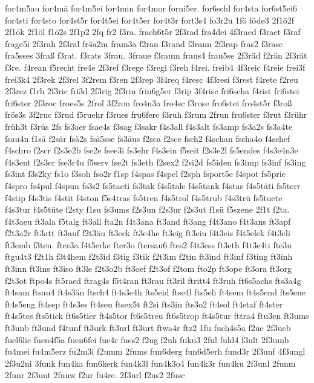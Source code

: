 {for4m5au
for4mä
for4m5ei
for4min
for4mor
forni5er.
for6schl
for4sta
for6st5ei6
for4sti
for4sto
for4st5r
for4t5ei
for4t5er
for4t3r
fort3s4
fo3r2u
1fö
föde3
2f1ö2f
2f1ök
2f1öl
f1ö2s
2f1p2
2fq
fr2
f3ra.
frach6t5r
2f3rad
fra4dei
4f3raed
f3raet
f3raf
frage5i
2f3rah
2f3ral
fr4a2m
fram3a
f2ran
f3rand
f3rann
2f3rap
fras2
f3rase
fra5sses
3fraß
f3rat.
f3rats
3frau.
3fraue
f3raum
fraus4
frau5se
2f3räd
f2rän
2f3rät
f3re.
f4rean
f5recht
fre4e
2f3ref
f3rege
f3regi
f3reh
f4rei.
freib4
4f3reic
f4reie
frei3f
frei3k4
2f3rek
2f3rel
3f2rem
f3ren
2f3rep
3f4req
f4resc
4f3resi
f3rest
f4rete
f2reu
2f3rez
f1rh
2f3ric
fri3d
2f3rig
2f3rin
frin6g5er
f3rip
3f4risc
fri6scha
f4rist
fri6stei
fri6ster
2f3roc
froes5s
2frol
3f2ron
fro4n3a
fro4sc
f3rose
fro6stei
fro4st5r
f3roß
frös3s
3f2ruc
f3rud
f5ruehr
f3rues
fru6fere
f3ruh
f3rum
2frun
fru6ster
f3rut
f3rühr
früh3t
f3rüs
2fs
fs3aer
fsae4s
f3sag
f3sakr
f4s3all
f4s3alt
fs3amp
fs3a2s
fs3a4te
fsau4n
f1sä
f2sär
fsä2s
fsä5sse
fs3äus
f2sca
f2sce
fsch2
f4schan
fscha4o
f4schef
f4schro
f2scr
f2s3e2b
fse2e
fsee3i
fs3ehr
f4s3ein
f5seit
f2s3e2l
fs5endes
f4s3e4n3e
f4s3ent
f2s3er
fse3r4u
f5serv
fse2t
fs3eth
f2sex2
f2si2d
fs5iden
fs3imp
fs3inf
fs3ing
fs3int
f3s2ky
fs1o
f3soh
fso2r
f1sp
f4spas
f4spel
f2sph
fsport5e
f4spot
fs5prie
f4spro
fs4pul
f4spun
fs3s2
fs5taeti
fs3tak
f4s5tale
f4s5tank
f4stas
f4s5täti
fs5terr
f4stip
f4s3tis
f4stit
f4ston
f5s4tras
fs5tren
f4s5trol
f4s5trub
f4s3trü
fs5tuete
f4s3tur
f4s5tüte
f2sty
f1su
fs3ums
f2s3un
f2s3ur
f2s3ut
f1sü
f5szene
2f1t
f2ta.
f4t3aeu
ft3ala
f5talg
ft3all
fta2n
f4t3ana
ft3and
ft3ang
f4t3ano
f4t3ans
ft3apf
f2t3a2r
ft3att
ft3auf
f2t3äu
ft3eck
ft3e4he
ft3eig
ft3ein
f4t3eis
f4t5elek
f4t3eli
ft3emb
f3ten.
fter3a
f4t5erke
fter3o
ftersau6
ftes2
f4t3ess
ft3eth
f4t3e4ti
fte3u
ftgu4t3
f2t1h
f3t4hem
f2t3id
f3tig
f3tik
f2t3im
f2tin
ft3ind
ft3inf
f3ting
ft3inh
ft3inn
ft3ins
ft3iso
ft3le
f2t3o2b
ft3oef
f2t3of
f2tom
fto2p
ft3ope
ft3ora
ft3org
f2t3ot
ftpo4s
ft5raed
ftrag4s
f5t4ran
ft3rau
ft3ril
ftritt4
ft3ruh
ft6s5achs
fts3a4g
ft4sam
ftsau4
ft4s3än
ftsch4
ft4s3e4h
fts5eid
ftse4l
fts5eli
ft4sem
ft4s5end
fts5ene
ft4s5eng
ft4sep
ft4s3es
ft4seu
ftsex5t
ft2si
fts3in
fts3o2
ft4sol
ft4staf
ft4ster
ft4s5tes
fts5tick
ft6s5tier
ft4s5tor
ft6s5treu
ft6s5trop
ft4s5tur
fttra4
ftu3en
ft3ums
ft3unb
ft3und
f4tunf
ft3urk
ft3url
ft3urt
ftwa4r
ftz2
1fu
fuch4s5a
f2ue
2f3ueb
fuel6lic
fuen4f5a
fuen6fei
fue4r
fues2
f2ug
f2uh
fuku3
2ful
fuld4
f3ult
2f3umb
fu4mei
fu4m5erz
fu2m3i
f2umm
2fums
fun6derg
fun6d5erh
fund3r
2f3unf
4f3ungl
2f3u2ni
3funk
fun4ka
fun6kerk
fun4k3l
fun4k3o4
fun4k3r
fun4ku
2f3unl
2funm
2funr
2f3unt
2funw
f2ur
fu4re.
2f3url
f2us2
2fusc
}
